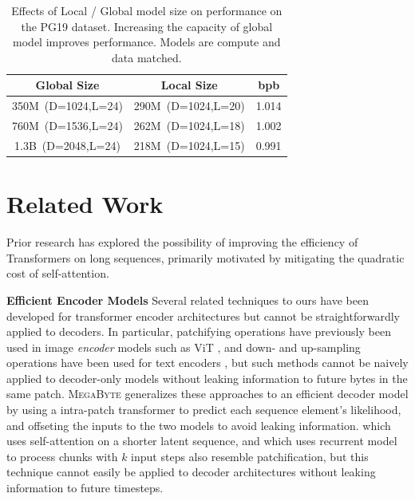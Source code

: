 \documentclass{article}
\newcommand{\fastslow}[0]{\textsc{MegaByte}\xspace}
\newcommand{\megabyte}[0]{\fastslow}
\newcommand{\bpb}[0]{bpb\xspace}
\theoremstyle{plain}
\theoremstyle{definition}
\theoremstyle{remark}
\begin{document}
\begin{table}[t]
    \centering\footnotesize	
    \begin{tabular}{ccc}
    \toprule
    Global Size & Local Size & \bpb \\
    \midrule
   350M~(D=1024,L=24)  & 290M~(D=1024,L=20) & 1.014  \\
    760M~(D=1536,L=24) & 262M~(D=1024,L=18) & 1.002  \\
    1.3B~(D=2048,L=24)  & 218M~(D=1024,L=15) & 0.991  \\
    \bottomrule
    \end{tabular}
    \caption{Effects of Local / Global model size on performance on the PG19 dataset. Increasing the capacity of global model improves performance. Models are compute and data matched.}
    \label{tab:size_inference}
\end{table}




\section{Related Work}
\label{sec:related}
Prior research has explored the possibility of improving the efficiency of Transformers on long sequences, primarily motivated by mitigating the quadratic cost of self-attention.

\textbf{Efficient Encoder Models} Several related techniques to ours have been developed for transformer encoder architectures but cannot be straightforwardly applied to decoders. In particular, patchifying operations have previously been used in image \emph{encoder} models such as ViT \citep{vit}, and down- and up-sampling operations have been used for text encoders \citep{canine}, but such methods cannot be naively applied to decoder-only models without leaking information to future bytes in the same patch. \megabyte generalizes these approaches to an efficient decoder model by using a intra-patch transformer to predict each sequence element's likelihood, and offseting the inputs to the two models to avoid leaking information. \citet{perceiver} which uses self-attention on a shorter latent sequence, and \citet{temporalbottleneck} which uses recurrent model to process chunks with $k$ input steps also resemble patchification, but this technique cannot easily be applied to decoder architectures without leaking information to future timesteps.
\end{document}
